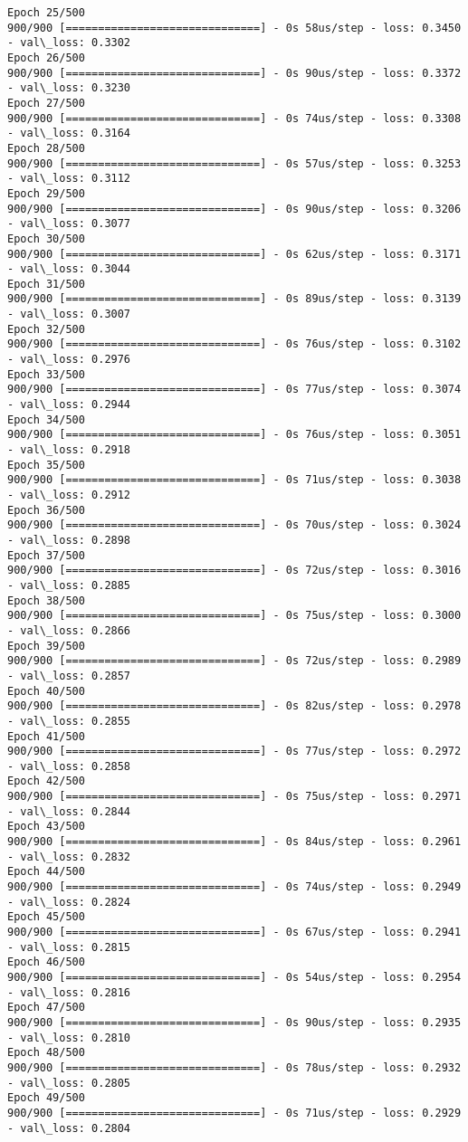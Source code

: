 \documentclass[11pt]{article}
\begin{document}
\begin{Verbatim}[commandchars=\\\{\}]
Epoch 25/500
900/900 [==============================] - 0s 58us/step - loss: 0.3450 - val\_loss: 0.3302
Epoch 26/500
900/900 [==============================] - 0s 90us/step - loss: 0.3372 - val\_loss: 0.3230
Epoch 27/500
900/900 [==============================] - 0s 74us/step - loss: 0.3308 - val\_loss: 0.3164
Epoch 28/500
900/900 [==============================] - 0s 57us/step - loss: 0.3253 - val\_loss: 0.3112
Epoch 29/500
900/900 [==============================] - 0s 90us/step - loss: 0.3206 - val\_loss: 0.3077
Epoch 30/500
900/900 [==============================] - 0s 62us/step - loss: 0.3171 - val\_loss: 0.3044
Epoch 31/500
900/900 [==============================] - 0s 89us/step - loss: 0.3139 - val\_loss: 0.3007
Epoch 32/500
900/900 [==============================] - 0s 76us/step - loss: 0.3102 - val\_loss: 0.2976
Epoch 33/500
900/900 [==============================] - 0s 77us/step - loss: 0.3074 - val\_loss: 0.2944
Epoch 34/500
900/900 [==============================] - 0s 76us/step - loss: 0.3051 - val\_loss: 0.2918
Epoch 35/500
900/900 [==============================] - 0s 71us/step - loss: 0.3038 - val\_loss: 0.2912
Epoch 36/500
900/900 [==============================] - 0s 70us/step - loss: 0.3024 - val\_loss: 0.2898
Epoch 37/500
900/900 [==============================] - 0s 72us/step - loss: 0.3016 - val\_loss: 0.2885
Epoch 38/500
900/900 [==============================] - 0s 75us/step - loss: 0.3000 - val\_loss: 0.2866
Epoch 39/500
900/900 [==============================] - 0s 72us/step - loss: 0.2989 - val\_loss: 0.2857
Epoch 40/500
900/900 [==============================] - 0s 82us/step - loss: 0.2978 - val\_loss: 0.2855
Epoch 41/500
900/900 [==============================] - 0s 77us/step - loss: 0.2972 - val\_loss: 0.2858
Epoch 42/500
900/900 [==============================] - 0s 75us/step - loss: 0.2971 - val\_loss: 0.2844
Epoch 43/500
900/900 [==============================] - 0s 84us/step - loss: 0.2961 - val\_loss: 0.2832
Epoch 44/500
900/900 [==============================] - 0s 74us/step - loss: 0.2949 - val\_loss: 0.2824
Epoch 45/500
900/900 [==============================] - 0s 67us/step - loss: 0.2941 - val\_loss: 0.2815
Epoch 46/500
900/900 [==============================] - 0s 54us/step - loss: 0.2954 - val\_loss: 0.2816
Epoch 47/500
900/900 [==============================] - 0s 90us/step - loss: 0.2935 - val\_loss: 0.2810
Epoch 48/500
900/900 [==============================] - 0s 78us/step - loss: 0.2932 - val\_loss: 0.2805
Epoch 49/500
900/900 [==============================] - 0s 71us/step - loss: 0.2929 - val\_loss: 0.2804

\end{Verbatim}
\end{document}
